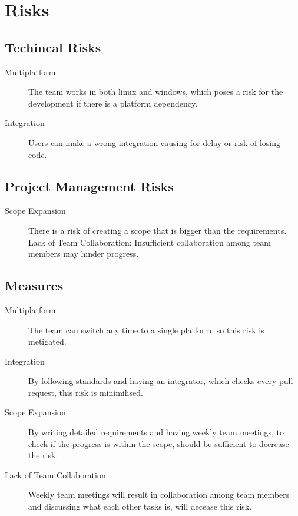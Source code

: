 \documentclass{projdoc}
\begin{document}
\section{Risks}

\subsection{Techincal Risks}

\begin{description}
	\item[Multiplatform] The team works in both linux and windows, which poses a risk
		for the development if there is a platform dependency.
	\item[Integration] Users can make a wrong integration causing for delay or risk of
		losing code.
\end{description}

\subsection{Project Management Risks}

\begin{description}
	\item[Scope Expansion] There is a risk of creating a scope that is bigger than the
		requirements. Lack of Team Collaboration: Insufficient collaboration among team
		members may hinder progress.
\end{description}

\subsection{Measures}

\begin{description}
	\item[Multiplatform] The team can switch any time to a single platform, so this
		risk is metigated. 
	\item[Integration] By following standards and having an integrator, which checks
		every pull request, this risk is minimilised.
	\item[Scope Expansion] By writing detailed requirements and having weekly team
		meetings, to check if the progress is within the scope, should be sufficient to
		decrease the risk.
	\item[Lack of Team Collaboration] Weekly team meetings will result in collaboration
		among team members and discussing what each other tasks is, will decease this
		risk.
\end{description}
\end{document}
